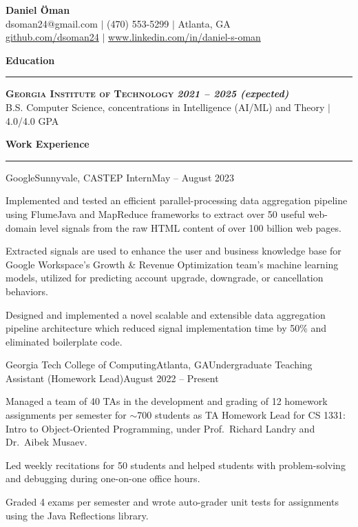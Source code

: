 \documentclass{article}
\newcommand{\horizontal}{\vspace{2pt}\hrule}
\newcommand{\school}[3]{\vspace{2pt}\textsc{\textbf{#1}} \hfill \textbf{\textit{#2}} \\ #3}
\newcommand{\sectitle}[1]{\vspace{2pt} \textbf{\large #1} \horizontal}
\begin{document}
\thispagestyle{empty}
\begin{center}
    \textbf{\LARGE Daniel Öman} \\
    dsoman24@gmail.com $|$ (470) 553-5299 $|$ Atlanta, GA \\
    \href{https://github.com/dsoman24}{github.com/dsoman24} $|$ \href{https://www.linkedin.com/in/daniel-s-oman/}{www.linkedin.com/in/daniel-s-oman}
\end{center}

\begin{flushleft}
\sectitle{Education}

\school{Georgia Institute of Technology}{2021 -- 2025 (expected)}
{B.S. Computer Science, concentrations in Intelligence (AI/ML) and Theory $|$ 4.0/4.0 GPA}

\sectitle{Work Experience}

    \begin{experience}{Google}{Sunnyvale, CA}{STEP Intern}{May -- August 2023}
        \item Implemented and tested an efficient parallel-processing data aggregation pipeline using FlumeJava and MapReduce frameworks to extract over 50 useful web-domain level signals from the raw HTML content of over 100 billion web pages.
        \item Extracted signals are used to enhance the user and business knowledge base for Google Workspace's Growth \& Revenue Optimization team's machine learning models, utilized for predicting account upgrade, downgrade, or cancellation behaviors.
        \item Designed and implemented a novel scalable and extensible data aggregation pipeline architecture which reduced signal implementation time by 50\% and eliminated boilerplate code.
    \end{experience}

    \begin{experience}{Georgia Tech College of Computing}{Atlanta, GA}{Undergraduate Teaching Assistant (Homework Lead)}{August 2022 -- Present}
        \item Managed a team of 40 TAs in the development and grading of 12 homework assignments per semester for $\sim$700 students as TA Homework Lead for CS 1331: Intro to Object-Oriented Programming, under Prof.~Richard Landry and Dr.~Aibek Musaev.
        \item Led weekly recitations for 50 students and helped students with problem-solving and debugging during one-on-one office hours.
        \item Graded 4 exams per semester and wrote auto-grader unit tests for assignments using the Java Reflections library.
    \end{experience}


\end{flushleft}
\end{document}
